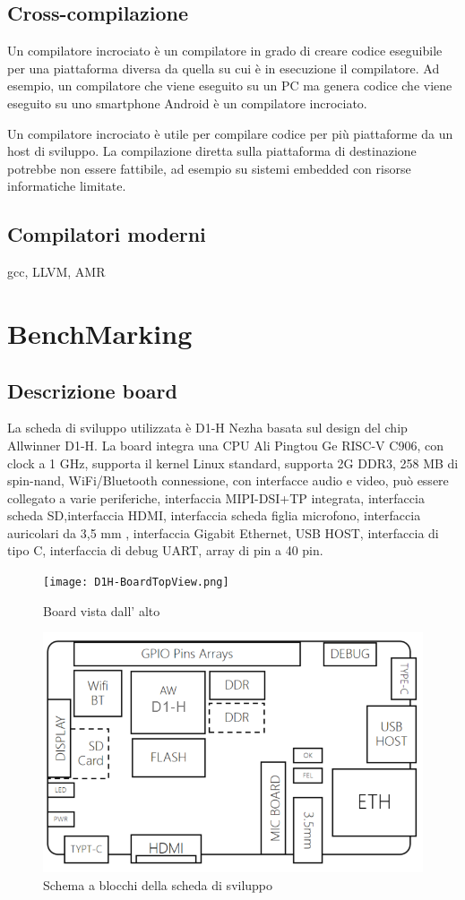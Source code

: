 \documentclass[12pt,a4paper]{report}
\begin{document}
\section{Cross-compilazione}
Un compilatore incrociato è un compilatore in grado di creare codice eseguibile per una piattaforma diversa da quella su cui è in esecuzione il compilatore. Ad esempio, un compilatore che viene eseguito su un PC ma genera codice che viene eseguito su uno smartphone Android è un compilatore incrociato.

Un compilatore incrociato è utile per compilare codice per più piattaforme da un host di sviluppo. La compilazione diretta sulla piattaforma di destinazione potrebbe non essere fattibile, ad esempio su sistemi embedded con risorse informatiche limitate.

\section{Compilatori moderni}

gcc, LLVM, AMR


\chapter{BenchMarking}
\section{Descrizione board}

La scheda di sviluppo utilizzata è  D1-H Nezha basata sul design del chip Allwinner D1-H. La board integra una CPU Ali Pingtou Ge RISC-V C906, con clock a 1 GHz, supporta il kernel Linux standard, supporta  2G DDR3, 258 MB di spin-nand, WiFi/Bluetooth connessione, con interfacce audio e video,  può essere collegato a varie periferiche, interfaccia MIPI-DSI+TP integrata, interfaccia scheda SD,interfaccia HDMI, interfaccia scheda figlia microfono, interfaccia auricolari da 3,5 mm , interfaccia Gigabit Ethernet, USB HOST, interfaccia di tipo C, interfaccia di debug UART, array di pin a 40 pin.

\begin{figure}
\texttt{[image: D1H-BoardTopView.png]}
\caption{Board vista dall' alto}

\includegraphics[width = \textwidth]{D1H-BoardBlockView.png}
\caption{Schema a blocchi della scheda di sviluppo}
\end{figure}
\end{document}
